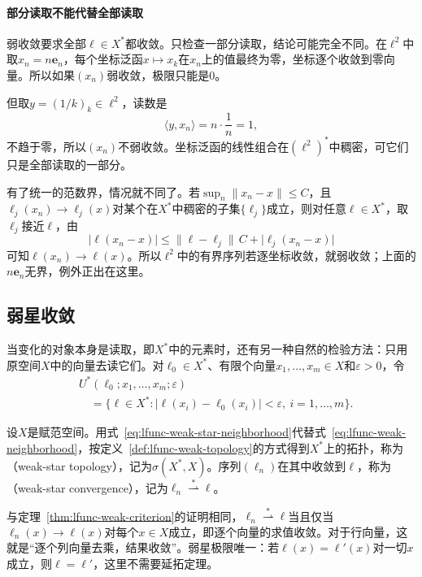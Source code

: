 \paragraph{部分读取不能代替全部读取}
弱收敛要求全部$\ell\in X^*$都收敛。只检查一部分读取，结论可能完全不同。在$\ell^2$中取$x_n=n\bm e_n$，每个坐标泛函$x\mapsto x_k$在$x_n$上的值最终为零，坐标逐个收敛到零向量。所以如果$(x_n)$弱收敛，极限只能是$0$。

但取$y=(1/k)_k\in\ell^2$，读数是
\[
\langle y,x_n\rangle=n\cdot\frac1n=1 ,
\]
不趋于零，所以$(x_n)$不弱收敛。坐标泛函的线性组合在$(\ell^2)^*$中稠密，可它们只是全部读取的一部分。

有了统一的范数界，情况就不同了。若$\sup_n\lVert x_n-x\rVert\leq C$，且$\ell_j(x_n)\to\ell_j(x)$对某个在$X^*$中稠密的子集$\{\ell_j\}$成立，则对任意$\ell\in X^*$，取$\ell_j$接近$\ell$，由
\[
\lvert\ell(x_n-x)\rvert\leq\lVert\ell-\ell_j\rVert\,C+\lvert\ell_j(x_n-x)\rvert
\]
可知$\ell(x_n)\to\ell(x)$。所以$\ell^2$中的有界序列若逐坐标收敛，就弱收敛；上面的$n\bm e_n$无界，例外正出在这里。

\subsection{弱星收敛}
\label{sec:lfunc-weak-star}

当变化的对象本身是读取，即$X^*$中的元素时，还有另一种自然的检验方法：只用原空间$X$中的向量去读它们。对$\ell_0\in X^*$、有限个向量$x_1,\ldots,x_m\in X$和$\varepsilon>0$，令
\begin{equation}
\begin{aligned}
&U^*(\ell_0;x_1,\ldots,x_m;\varepsilon)\\
&\quad=\{\ell\in X^*:\lvert\ell(x_i)-\ell_0(x_i)\rvert<\varepsilon,\ i=1,\ldots,m\}.
\end{aligned}
\label{eq:lfunc-weak-star-neighborhood}
\end{equation}

\begin{definition}[弱星拓扑与弱星收敛]
\label{def:lfunc-weak-star}
设$X$是赋范空间。用式~\eqref{eq:lfunc-weak-star-neighborhood}代替式~\eqref{eq:lfunc-weak-neighborhood}，按定义~\ref{def:lfunc-weak-topology}的方式得到$X^*$上的拓扑，称为（weak-star topology），记为$\sigma(X^*,X)$。序列$(\ell_n)$在其中收敛到$\ell$，称为（weak-star convergence），记为$\ell_n\overset{*}{\rightharpoonup}\ell$。
\end{definition}

与定理~\ref{thm:lfunc-weak-criterion}的证明相同，$\ell_n\overset{*}{\rightharpoonup}\ell$当且仅当$\ell_n(x)\to\ell(x)$对每个$x\in X$成立，即逐个向量的求值收敛。对于行向量，这就是“逐个列向量去乘，结果收敛”。弱星极限唯一：若$\ell(x)=\ell'(x)$对一切$x$成立，则$\ell=\ell'$，这里不需要延拓定理。

